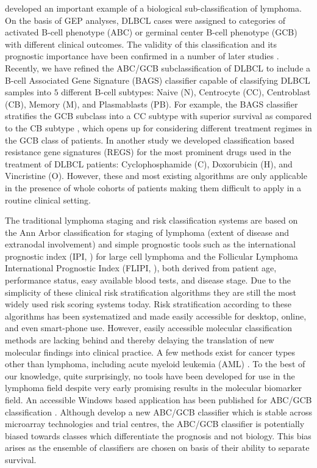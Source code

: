 \documentclass[10pt,letterpaper]{article}
\begin{document}
\cite{Alizadeh2000} developed an important example of a biological sub-classification of lymphoma.
On the basis of GEP analyses, DLBCL cases were assigned to categories of activated B-cell phenotype (ABC) or germinal center B-cell phenotype (GCB) with different clinical outcomes.
The validity of this classification and its prognostic importance have been confirmed in a number of later studies \cite{Rosenwald2002a,Hans2004,Poulsen2005,Lenz2008a,Monti2012a}.
Recently, we have refined the ABC/GCB subclassification of DLBCL to include a B-cell Associated Gene Signature (BAGS) classifier \cite{DybkaerBoegsted2015} capable of classifying DLBCL samples into $5$ different B-cell subtypes:
Naive (N), Centrocyte (CC), Centroblast (CB), Memory (M), and Plasmablasts (PB).
For example, the BAGS classifier stratifies the GCB subclass into a CC subtype with superior survival as compared to the CB subtype \cite{DybkaerBoegsted2015}, which opens up for considering different treatment regimes in the GCB class of patients.
In another study \cite{Falgreen2015} we developed classification based resistance gene signatures (REGS) for the most prominent drugs used in the treatment of DLBCL patients:
Cyclophosphamide (C), Doxorubicin (H), and Vincristine (O).
However, these and most existing algorithms are only applicable in the presence of whole cohorts of patients making them difficult to apply in a routine clinical setting.

The traditional lymphoma staging and risk classification systems are based on the Ann Arbor classification for staging of lymphoma (extent of disease and extranodal involvement) and simple prognostic tools such as the international prognostic index (IPI, \cite{IPI}) for large cell lymphoma and the Follicular Lymphoma International Prognostic Index (FLIPI, \cite{FLIPI}), both derived from patient age, performance status, easy available blood tests, and disease stage.
Due to the simplicity of these clinical risk stratification algorithms they are still the most widely used risk scoring systems today.
Risk stratification according to these algorithms has been systematized and made easily accessible for desktop, online, and even smart-phone use.
However, easily accessible molecular classification methods are lacking behind and thereby delaying the translation of new molecular findings into clinical practice.
A few methods exist for cancer types other than lymphoma, including acute myeloid leukemia (AML) \cite{Huang2009}.
To the best of our knowledge, quite surprisingly, no tools have been developed for use in the lymphoma field despite very early promising results in the molecular biomarker field.
An accessible Windows based application has been published for ABC/GCB classification \cite{Care2013}.
Although \cite{Care2013} develop a new ABC/GCB classifier which is stable across microarray technologies and trial centres, the ABC/GCB classifier is potentially biased towards classes which differentiate the prognosis and not biology.
This bias arises as the ensemble of classifiers are chosen on basis of their ability to separate survival.
\end{document}
